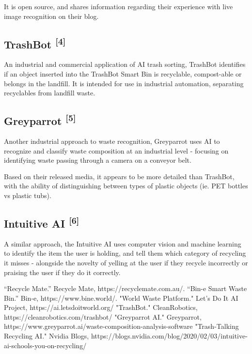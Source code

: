 \documentclass[conference]{IEEEtran}
\begin{document}
It is open source, and shares information regarding their experience with live image recognition on their blog.
\newline

\subsection{TrashBot \textsuperscript{[4]}}

An industrial and commercial application of AI trash sorting, TrashBot identifies if an object inserted into the TrashBot Smart Bin is recyclable, compost-able or belongs in the landfill. It is intended for use in industrial automation, separating recyclables from landfill waste. 
\newline

\subsection{Greyparrot \textsuperscript{[5]}}

Another industrial approach to waste recognition, Greyparrot uses AI to recognize and classify waste composition at an industrial level - focusing on identifying waste passing through a camera on a conveyor belt.

Based on their released media, it appears to be more detailed than TrashBot, with the ability of distinguishing between types of plastic objects (ie. PET bottles vs plastic tubs).
\newline

\subsection{Intuitive AI \textsuperscript{[6]}}

A similar approach, the Intuitive AI uses computer vision and machine learning to identify the item the user is holding, and tell them which category of recycling it misses - alongside the novelty of yelling at the user if they recycle incorrectly or praising the user if they do it correctly.
\newline

\begin{thebibliography}{00}
 “Recycle Mate.” Recycle Mate, https://recyclemate.com.au/. 
 “Bin-e Smart Waste Bin.” Bin-e, https://www.bine.world/. 
 "World Waste Platform." Let's Do It AI Project, https://ai.letsdoitworld.org/
 "TrashBot." CleanRobotics, https://cleanrobotics.com/trashbot/
 "Greyparrot AI." Greyparrot, https://www.greyparrot.ai/waste-composition-analysis-software
 "Trash-Talking Recycling AI." Nvidia Blogs, https://blogs.nvidia.com/blog/2020/02/03/intuitive-ai-schools-you-on-recycling/
\end{thebibliography}~\\~\\
\end{document}
